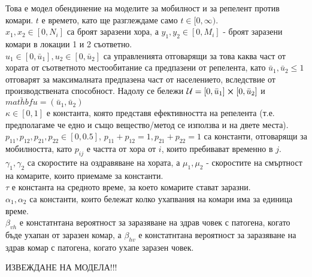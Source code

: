 Това е модел обендинение на моделите за мобилност и за репелент против комари.
$t$ е времето, като ще разглеждаме само $t \in [0, \infty)$. \\
$x_1, x_2 \in [0, N_i]$ са броят заразени хора, а $y_1, y_2 \in [0, M_i]$ - броят заразени комари в локации 1 и 2 съответно. \\
$u_1 \in [0, \bar{u}_1], u_2 \in [0, \bar{u}_2]$ са управленията отговарящи за това каква част от хората от съответното местообитание са предпазени от репелента, като $ \bar{u}_1, \bar{u}_2 \leq 1 $ отговарят за максималната предпазена част от населението, вследствие от производствената способност. Надолу се бележи $\mathcal{U} = [0, \bar{u}_1] \cross [0, \bar{u}_2]$ и $\bar{mathbf{u}} = (\bar{u}_1, \bar{u}_2)$ \\
$\kappa \in [0, 1]$ е константа, която представя ефективността на репелента (т.е. предполагаме че едно и също вещество/метод се използва и на двете места). \\
$p_{11}, p_{12}, p_{21}, p_{22} \in [0, 0.5]$, $p_{11} + p_{12} = 1, p_{21} + p_{22} = 1$ са константи, отговарящи за мобилността, като $p_{ij}$ е частта от хора от $i$, които пребивават временно в $j$. \\
$\gamma_1, \gamma_2$ са скоростите на оздравяване на хората, а $\mu_1, \mu_2$ - скоростите на смъртност на комарите, които приемаме за константи. \\
$\tau$ е константа на средното време, за което комарите стават заразни. \\
$\alpha_1, \alpha_2$ са константи, които бележат колко ухапвания на комари има за единица време. \\
$\beta_{vh}$ е констатнтана вероятност за заразяване на здрав човек с патогена, когато бъде ухапан от заразен комар, а $\beta_{hv}$ е констатнтана вероятност за заразяване на здрав комар с патогена, когато ухапе заразен човек.

\color{Red} ИЗВЕЖДАНЕ НА МОДЕЛА!!!
\color{Black}

